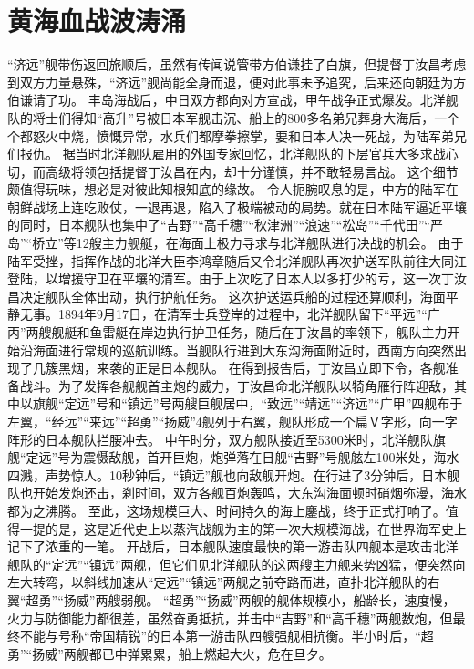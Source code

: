 \documentclass[12pt,UTF8]{ctexbook}
\begin{document}
\chapter{黄海血战波涛涌}

“济远”舰带伤返回旅顺后，虽然有传闻说管带方伯谦挂了白旗，但提督丁汝昌考虑到双方力量悬殊，“济远”舰尚能全身而退，便对此事未予追究，后来还向朝廷为方伯谦请了功。
丰岛海战后，中日双方都向对方宣战，甲午战争正式爆发。北洋舰队的将士们得知“高升”号被日本军舰击沉、船上的800多名弟兄葬身大海后，一个个都怒火中烧，愤慨异常，水兵们都摩拳擦掌，要和日本人决一死战，为陆军弟兄们报仇。
据当时北洋舰队雇用的外国专家回忆，北洋舰队的下层官兵大多求战心切，而高级将领包括提督丁汝昌在内，却十分谨慎，并不敢轻易言战。
这个细节颇值得玩味，想必是对彼此知根知底的缘故。
令人扼腕叹息的是，中方的陆军在朝鲜战场上连吃败仗，一退再退，陷入了极端被动的局势。就在日本陆军逼近平壤的同时，日本舰队也集中了“吉野”“高千穗”“秋津洲”“浪速”“松岛”“千代田”“严岛”“桥立”等12艘主力舰艇，在海面上极力寻求与北洋舰队进行决战的机会。
由于陆军受挫，指挥作战的北洋大臣李鸿章随后又令北洋舰队再次护送军队前往大同江登陆，以增援守卫在平壤的清军。由于上次吃了日本人以多打少的亏，这一次丁汝昌决定舰队全体出动，执行护航任务。
这次护送运兵船的过程还算顺利，海面平静无事。1894年9月17日，在清军士兵登岸的过程中，北洋舰队留下“平远”“广丙”两艘舰艇和鱼雷艇在岸边执行护卫任务，随后在丁汝昌的率领下，舰队主力开始沿海面进行常规的巡航训练。当舰队行进到大东沟海面附近时，西南方向突然出现了几簇黑烟，来袭的正是日本舰队。
在得到报告后，丁汝昌立即下令，各舰准备战斗。为了发挥各舰舰首主炮的威力，丁汝昌命北洋舰队以犄角雁行阵迎敌，其中以旗舰“定远”号和“镇远”号两艘巨舰居中，“致远”“靖远”“济远”“广甲”四舰布于左翼，“经远”“来远”“超勇”“扬威”4舰列于右翼，舰队形成一个扁Ｖ字形，向一字阵形的日本舰队拦腰冲去。
中午时分，双方舰队接近至5300米时，北洋舰队旗舰“定远”号为震慑敌舰，首开巨炮，炮弹落在日舰“吉野”号舰舷左100米处，海水四溅，声势惊人。10秒钟后，“镇远”舰也向敌舰开炮。在行进了3分钟后，日本舰队也开始发炮还击，刹时间，双方各舰百炮轰鸣，大东沟海面顿时硝烟弥漫，海水都为之沸腾。
至此，这场规模巨大、时间持久的海上鏖战，终于正式打响了。值得一提的是，这是近代史上以蒸汽战舰为主的第一次大规模海战，在世界海军史上记下了浓重的一笔。
开战后，日本舰队速度最快的第一游击队四舰本是攻击北洋舰队的“定远”“镇远”两舰，但它们见北洋舰队的这两艘主力舰来势凶猛，便突然向左大转弯，以斜线加速从“定远”“镇远”两舰之前夺路而进，直扑北洋舰队的右翼“超勇”“扬威”两艘弱舰。
“超勇”“扬威”两舰的舰体规模小，船龄长，速度慢，火力与防御能力都很差，虽然奋勇抵抗，并击中“吉野”和“高千穗”两舰数炮，但最终不能与号称“帝国精锐”的日本第一游击队四艘强舰相抗衡。半小时后，“超勇”“扬威”两舰都已中弹累累，船上燃起大火，危在旦夕。
\end{document}
